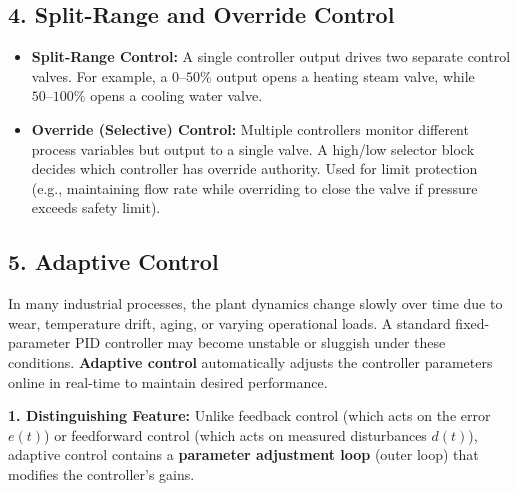\documentclass[12pt,a4paper]{article}
\begin{document}
\subsection{4. Split-Range and Override Control}
\begin{itemize}[leftmargin=*, itemsep=2.5pt]
  \item \textbf{Split-Range Control:} A single controller output drives two separate control valves. For example, a $0\text{--}50\%$ output opens a heating steam valve, while $50\text{--}100\%$ opens a cooling water valve.
  \item \textbf{Override (Selective) Control:} Multiple controllers monitor different process variables but output to a single valve. A high/low selector block decides which controller has override authority. Used for limit protection (e.g., maintaining flow rate while overriding to close the valve if pressure exceeds safety limit).
\end{itemize}

\subsection{5. Adaptive Control}
In many industrial processes, the plant dynamics change slowly over time due to wear, temperature drift, aging, or varying operational loads. A standard fixed-parameter PID controller may become unstable or sluggish under these conditions. \textbf{Adaptive control} automatically adjusts the controller parameters online in real-time to maintain desired performance.

\textbf{1. Distinguishing Feature:}
Unlike feedback control (which acts on the error $e(t)$) or feedforward control (which acts on measured disturbances $d(t)$), adaptive control contains a \textbf{parameter adjustment loop} (outer loop) that modifies the controller's gains.
\end{document}
